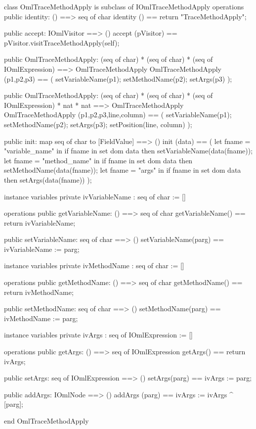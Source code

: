 \begin{vdm_al}
class OmlTraceMethodApply is subclass of IOmlTraceMethodApply
operations
  public identity: () ==> seq of char
  identity () == return "TraceMethodApply";

  public accept: IOmlVisitor ==> ()
  accept (pVisitor) == pVisitor.visitTraceMethodApply(self);

  public OmlTraceMethodApply:
    (seq of char) *
    (seq of char) *
    (seq of IOmlExpression) ==> OmlTraceMethodApply
  OmlTraceMethodApply (p1,p2,p3) == 
    ( setVariableName(p1);
      setMethodName(p2);
      setArgs(p3) );

  public OmlTraceMethodApply:
    (seq of char) *
    (seq of char) *
    (seq of IOmlExpression) *
    nat *
    nat ==> OmlTraceMethodApply
  OmlTraceMethodApply (p1,p2,p3,line,column) == 
    ( setVariableName(p1);
      setMethodName(p2);
      setArgs(p3);
      setPosition(line, column) );

  public init: map seq of char to [FieldValue] ==> ()
  init (data) ==
    ( let fname = "variable_name" in
        if fname in set dom data
        then setVariableName(data(fname));
      let fname = "method_name" in
        if fname in set dom data
        then setMethodName(data(fname));
      let fname = "args" in
        if fname in set dom data
        then setArgs(data(fname)) );

instance variables
  private ivVariableName : seq of char := []

operations
  public getVariableName: () ==> seq of char
  getVariableName() == return ivVariableName;

  public setVariableName: seq of char ==> ()
  setVariableName(parg) == ivVariableName := parg;

instance variables
  private ivMethodName : seq of char := []

operations
  public getMethodName: () ==> seq of char
  getMethodName() == return ivMethodName;

  public setMethodName: seq of char ==> ()
  setMethodName(parg) == ivMethodName := parg;

instance variables
  private ivArgs : seq of IOmlExpression := []

operations
  public getArgs: () ==> seq of IOmlExpression
  getArgs() == return ivArgs;

  public setArgs: seq of IOmlExpression ==> ()
  setArgs(parg) == ivArgs := parg;

  public addArgs: IOmlNode ==> ()
  addArgs (parg) == ivArgs := ivArgs ^ [parg];

end OmlTraceMethodApply
\end{vdm_al}

